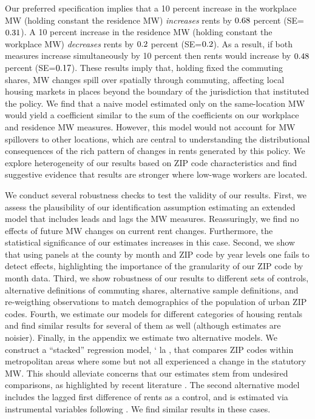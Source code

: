 
Our preferred specification implies that 
a 10 percent increase in the workplace MW (holding constant the residence MW) 
\textit{increases} rents by $\textnormal{0.68}$ percent 
(SE=$\textnormal{0.31}$).
A 10 percent increase in the residence MW (holding constant the workplace MW) 
\textit{decreases} rents by $\textnormal{0.2}$ percent 
(SE=$\textnormal{0.2}$). 
As a result, if both measures increase simultaneously by 10 percent then 
rents would increase by $\textnormal{0.48}$ percent 
(SE=$\textnormal{0.17}$).
These results imply that, holding fixed the commuting shares, MW 
changes spill over spatially through commuting, affecting local housing markets 
in places beyond the boundary of the jurisdiction that instituted the policy.
We find that a naive model estimated only on the same-location MW would yield a 
coefficient similar to the sum of the coefficients on our workplace and 
residence MW measures.
However, this model would not account for MW spillovers to other locations, 
which are central to understanding the distributional consequences of the rich 
pattern of changes in rents generated by this policy.
We explore heterogeneity of our results based on ZIP code characteristics and
find suggestive evidence that results are stronger where low-wage workers are 
located.


We conduct several robustness checks to test the validity of our results.
First, we assess the plausibility of our identification assumption estimating 
an extended model that includes leads and lags the MW measures.
Reassuringly, we find no effects of future MW changes on current rent changes.
Furthermore, the statistical significance of our estimates increases in 
this case.
Second, we show that using panels at the county by month and ZIP code by year 
levels one fails to detect effects, highlighting the importance of the 
granularity of our ZIP code by month data.
Third, we show robustness of our results to different sets of controls,
alternative definitions of commuting shares, alternative sample definitions,
and re-weigthing observations to match demographics of the population of
urban ZIP codes.
Fourth, we estimate our models for different categories of housing rentals and
find similar results for several of them as well (although estimates are noisier).
Finally, in the appendix we estimate two alternative models.
We construct a ``stacked'' regression model, \a` la , 
that compares ZIP codes within metropolitan areas where some but not 
all experienced a change in the statutory MW.
This should alleviate concerns that our estimates stem from undesired 
comparisons, as highlighted by recent literature 
\parencite{deChaisemartinEtAl2022,RothEtAl2022}.
The second alternative model includes the lagged first difference of rents as 
a control, and is estimated via instrumental variables following 
\textcite{ArellanoBond1991}.
We find similar results in these cases.

